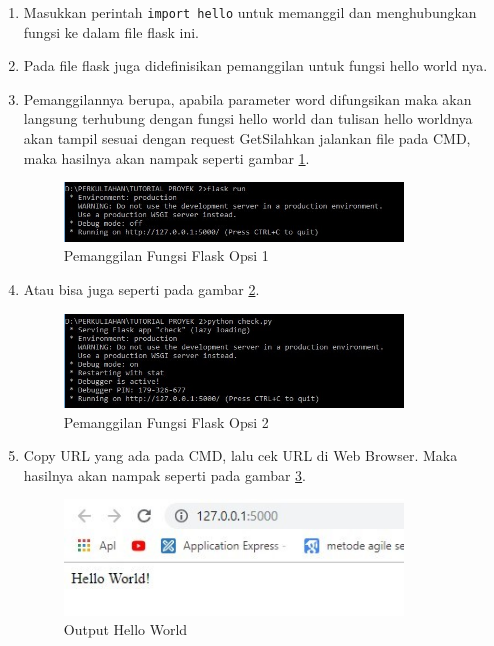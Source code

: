 \begin{enumerate}
\item Masukkan perintah \verb|import hello| untuk memanggil dan menghubungkan fungsi ke dalam file flask ini.
\item Pada file flask juga didefinisikan pemanggilan untuk fungsi hello world nya.
\item Pemanggilannya berupa, apabila parameter word difungsikan maka akan langsung terhubung dengan fungsi hello world dan tulisan hello worldnya akan tampil sesuai dengan request GetSilahkan jalankan file pada CMD, maka hasilnya akan nampak seperti gambar \ref{fig:call_function1}.
\begin{figure}[!htbp]
	\centerline{\includegraphics[width=0.85\textwidth]{figures/8/call_function1.jpg}}
	\caption{Pemanggilan Fungsi Flask Opsi 1}
	\label{fig:call_function1}
\end{figure} 
 
\item Atau bisa juga seperti pada gambar \ref{fig:call_function2}.
\begin{figure}[!htbp]
	\centerline{\includegraphics[width=0.85\textwidth]{figures/8/call_function2.jpg}}
	\caption{Pemanggilan Fungsi Flask Opsi 2}
	\label{fig:call_function2}
\end{figure} 
 
\item Copy URL yang ada pada CMD, lalu cek URL di Web Browser. Maka hasilnya akan nampak seperti pada gambar \ref{fig:hello_world}.
\begin{figure}[!htbp]
	\centerline{\includegraphics[width=0.85\textwidth]{figures/8/hello_world.jpg}}
	\caption{Output Hello World}
	\label{fig:hello_world}
\end{figure} 
\end{enumerate} 

